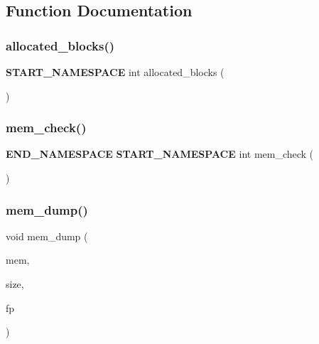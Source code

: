 \subsection{Function Documentation}
\mbox{\label{memtrace_8h_ab8ef9a94a4ba8246012e9bfeb5b0c589}} 
\subsubsection{allocated\+\_\+blocks()}
{\footnotesize\ttfamily \textbf{ S\+T\+A\+R\+T\+\_\+\+N\+A\+M\+E\+S\+P\+A\+CE} int allocated\+\_\+blocks (\begin{DoxyParamCaption}{ }\end{DoxyParamCaption})}

\mbox{\label{memtrace_8h_ab531f5bcfca2f50b8c2a43f7bb96fc0e}} 
\subsubsection{mem\+\_\+check()}
{\footnotesize\ttfamily \textbf{ E\+N\+D\+\_\+\+N\+A\+M\+E\+S\+P\+A\+CE} \textbf{ S\+T\+A\+R\+T\+\_\+\+N\+A\+M\+E\+S\+P\+A\+CE} int mem\+\_\+check (\begin{DoxyParamCaption}\item[{void}]{ }\end{DoxyParamCaption})}

\mbox{\label{memtrace_8h_a031b528c007e2e8ba5d814be13d3860c}} 
\subsubsection{mem\+\_\+dump()}
{\footnotesize\ttfamily void mem\+\_\+dump (\begin{DoxyParamCaption}\item[{void const $\ast$}]{mem,  }\item[{size\+\_\+t}]{size,  }\item[{F\+I\+LE $\ast$}]{fp }\end{DoxyParamCaption})}

\mbox{\label{memtrace_8h_a8d30ad82fb5ab2f070bb8552d5f71575}} 

